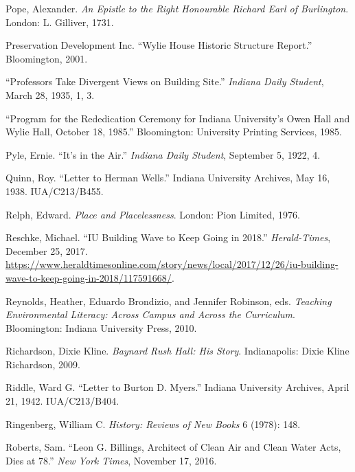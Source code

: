 \documentclass[
  american,
  letterpaper,
]{scrreprt}
\newlength{\cslhangindent}
\newenvironment{CSLReferences}[2] %
 {\begin{list}{}{%
  \setlength{\itemindent}{0pt}
  \setlength{\leftmargin}{0pt}
  \setlength{\parsep}{0pt}
  \ifodd #1
   \setlength{\leftmargin}{\cslhangindent}
   \setlength{\itemindent}{-1\cslhangindent}
  \fi
  \setlength{\itemsep}{#2\baselineskip}}}
 {\end{list}}
\begin{document}
\begin{CSLReferences}{1}{0}
Pope, Alexander. \emph{An Epistle to the Right Honourable Richard Earl
of Burlington}. London: L. Gilliver, 1731.

Preservation Development Inc. {``Wylie House Historic Structure
Report.''} Bloomington, 2001.

{``Professors Take Divergent Views on Building Site.''} \emph{Indiana
Daily Student}, March 28, 1935, 1, 3.

{``Program for the Rededication Ceremony for Indiana University's Owen
Hall and Wylie Hall, October 18, 1985.''} Bloomington: University
Printing Services, 1985.

Pyle, Ernie. {``It's in the Air.''} \emph{Indiana Daily Student},
September 5, 1922, 4.

Quinn, Roy. {``Letter to Herman Wells.''} Indiana University Archives,
May 16, 1938. IUA/C213/B455.

Relph, Edward. \emph{Place and Placelessness}. London: Pion Limited,
1976.

Reschke, Michael. {``IU Building Wave to Keep Going in 2018.''}
\emph{Herald-Times}, December 25, 2017.
\url{https://www.heraldtimesonline.com/story/news/local/2017/12/26/iu-building-wave-to-keep-going-in-2018/117591668/}.

Reynolds, Heather, Eduardo Brondizio, and Jennifer Robinson, eds.
\emph{Teaching Environmental Literacy: Across Campus and Across the
Curriculum}. Bloomington: Indiana University Press, 2010.

Richardson, Dixie Kline. \emph{Baynard Rush Hall: His Story}.
Indianapolis: Dixie Kline Richardson, 2009.

Riddle, Ward G. {``Letter to Burton {D.} Myers.''} Indiana University
Archives, April 21, 1942. IUA/C213/B404.

Ringenberg, William C. \emph{History: Reviews of New Books} 6 (1978):
148.

Roberts, Sam. {``Leon {G}. Billings, Architect of Clean Air and Clean
Water Acts, Dies at 78.''} \emph{New York Times}, November 17, 2016.


\end{CSLReferences}
\end{document}
